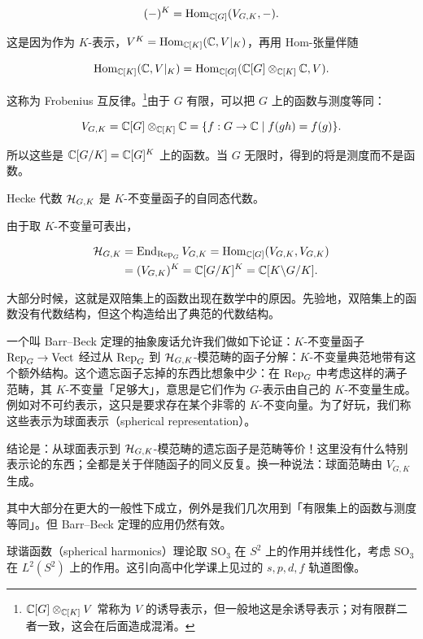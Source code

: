 \[(-)^K=\operatorname{Hom}_{\mathbb{C}[G]}(V_{G,K},-).\]

这是因为作为 $K$-表示，$V^K=\operatorname{Hom}_{\mathbb{C}[K]}(\mathbb{C},V|_K)$，再用 Hom-张量伴随

\[\operatorname{Hom}_{\mathbb{C}[K]}(\mathbb{C},V|_K)=\operatorname{Hom}_{\mathbb{C}[G]}(\mathbb{C}[G]\otimes_{\mathbb{C}[K]}\mathbb{C},V).\]

这称为 Frobenius 互反律。\footnote{$\mathbb{C}[G]\otimes_{\mathbb{C}[K]}V$ 常称为 $V$ 的诱导表示，但一般地这是余诱导表示；对有限群二者一致，这会在后面造成混淆。}由于 $G$ 有限，可以把 $G$ 上的函数与测度等同：

\[V_{G,K}=\mathbb{C}[G]\otimes_{\mathbb{C}[K]}\mathbb{C}=\{f:G\to\mathbb{C}\mid f(gh)=f(g)\}.\]

所以这些是 $\mathbb{C}[G/K]=\mathbb{C}[G]^K$ 上的函数。当 $G$ 无限时，得到的将是测度而不是函数。

\begin{definition}
Hecke 代数 $\mathcal{H}_{G,K}$ 是 $K$-不变量函子的自同态代数。
\end{definition}

由于取 $K$-不变量可表出，

\begin{align*}
\mathcal{H}_{G,K}&=\operatorname{End}_{\operatorname{Rep}_G}V_{G,K}=\operatorname{Hom}_{\mathbb{C}[G]}(V_{G,K},V_{G,K})\\
&=(V_{G,K})^K=\mathbb{C}[G/K]^K=\mathbb{C}[K\backslash G/K].
\end{align*}

大部分时候，这就是双陪集上的函数出现在数学中的原因。先验地，双陪集上的函数没有代数结构，但这个构造给出了典范的代数结构。

一个叫 Barr–Beck 定理的抽象废话允许我们做如下论证：$K$-不变量函子 $\operatorname{Rep}_G\to\mathrm{Vect}$ 经过从 $\operatorname{Rep}_G$ 到 $\mathcal{H}_{G,K}$-模范畴的函子分解：$K$-不变量典范地带有这个额外结构。这个遗忘函子忘掉的东西比想象中少：在 $\operatorname{Rep}_G$ 中考虑这样的满子范畴，其 $K$-不变量「足够大」，意思是它们作为 $G$-表示由自己的 $K$-不变量生成。例如对不可约表示，这只是要求存在某个非零的 $K$-不变向量。为了好玩，我们称这些表示为球面表示（spherical representation）。

结论是：从球面表示到 $\mathcal{H}_{G,K}$-模范畴的遗忘函子是范畴等价！这里没有什么特别表示论的东西；全都是关于伴随函子的同义反复。换一种说法：球面范畴由 $V_{G,K}$ 生成。

其中大部分在更大的一般性下成立，例外是我们几次用到「有限集上的函数与测度等同」。但 Barr–Beck 定理的应用仍然有效。

\begin{example}
球谐函数（spherical harmonics）理论取 $\mathrm{SO}_3$ 在 $S^2$ 上的作用并线性化，考虑 $\mathrm{SO}_3$ 在 $L^2(S^2)$ 上的作用。这引向高中化学课上见过的 $s,p,d,f$ 轨道图像。
\end{example}


